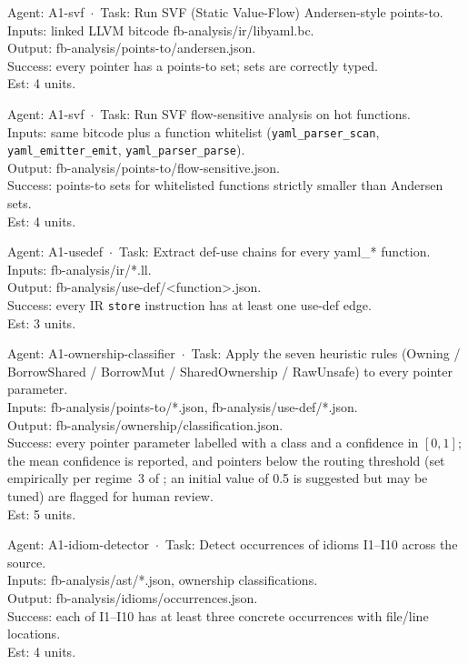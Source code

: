 \documentclass[12pt]{article}
\theoremstyle{definition}
\theoremstyle{remark}
\newenvironment{tasklist}{%
  \begingroup\raggedright
  \begin{description}[style=nextline, leftmargin=1.8cm, itemsep=0.4em]
}{%
  \end{description}
  \endgroup
}
\begin{document}
\begin{tasklist}

\item[T11.] {\ttfamily [~] Agent: A1-svf~$\cdot$~Task: Run SVF (Static Value-Flow) Andersen-style points-to.}\\
Inputs: linked LLVM bitcode fb-analysis/ir/libyaml.bc.\\
Output: fb-analysis/points-to/andersen.json.\\
Success: every pointer has a points-to set; sets are correctly typed.\\
Est: 4 units.

\item[T12.] {\ttfamily [~] Agent: A1-svf~$\cdot$~Task: Run SVF flow-sensitive analysis on hot functions.}\\
Inputs: same bitcode plus a function whitelist (\verb|yaml_parser_scan|, \verb|yaml_emitter_emit|, \verb|yaml_parser_parse|).\\
Output: fb-analysis/points-to/flow-sensitive.json.\\
Success: points-to sets for whitelisted functions strictly smaller than Andersen sets.\\
Est: 4 units.

\item[T13.] {\ttfamily [~] Agent: A1-usedef~$\cdot$~Task: Extract def-use chains for every yaml\_* function.}\\
Inputs: fb-analysis/ir/*.ll.\\
Output: fb-analysis/use-def/<function>.json.\\
Success: every IR \verb|store| instruction has at least one use-def edge.\\
Est: 3 units.

\item[T14.] {\ttfamily [~] Agent: A1-ownership-classifier~$\cdot$~Task: Apply the seven heuristic rules (Owning / BorrowShared / BorrowMut / SharedOwnership / RawUnsafe) to every pointer parameter.}\\
Inputs: fb-analysis/points-to/*.json, fb-analysis/use-def/*.json.\\
Output: fb-analysis/ownership/classification.json.\\
Success: every pointer parameter labelled with a class and a confidence in $[0, 1]$; the mean confidence is reported, and pointers below the routing threshold (set empirically per regime~3 of ; an initial value of 0.5 is suggested but may be tuned) are flagged for human review.\\
Est: 5 units.

\item[T15.] {\ttfamily [~] Agent: A1-idiom-detector~$\cdot$~Task: Detect occurrences of idioms I1--I10 across the source.}\\
Inputs: fb-analysis/ast/*.json, ownership classifications.\\
Output: fb-analysis/idioms/occurrences.json.\\
Success: each of I1--I10 has at least three concrete occurrences with file/line locations.\\
Est: 4 units.

\end{tasklist}
\end{document}

